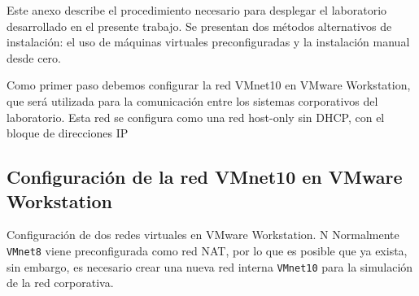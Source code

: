 
Este anexo describe el procedimiento necesario para desplegar el laboratorio desarrollado en el presente trabajo. Se presentan dos métodos alternativos de instalación: el uso de máquinas virtuales preconfiguradas y la instalación manual desde cero.




Como primer paso debemos configurar la red VMnet10 en VMware Workstation, que será utilizada para la comunicación entre los sistemas corporativos del laboratorio. Esta red se configura como una red host-only sin DHCP, con el bloque de direcciones IP

\subsection*{Configuración de la red VMnet10 en VMware Workstation}

Configuración de dos redes virtuales en VMware Workstation. N Normalmente \texttt{VMnet8} viene preconfigurada como red NAT, por lo que es posible que ya exista, sin embargo, es necesario crear una nueva red interna  \texttt{VMnet10} para la simulación de la red corporativa.

